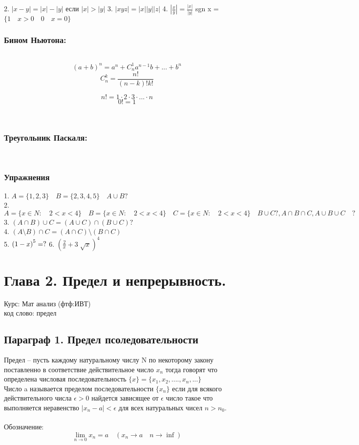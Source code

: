 \documentclass[a4paper, 12pt]{article}
\begin{document}
2. $  |x - y|= |x| - |y|$ если $ |x| > |y| $
3. $ |xyz| = |x||y||z| $
4. $ \left| \frac{x}{y}\right| =  \frac{|x|}{|y|}$
sgn x = $ \{ 1 \quad x>0 \quad 0 \quad x=0\} $\\

\subsubsection*{Бином Ньютона:}\\
\[
	\left( a + b\right)^n = a^n + C_n^1 a^{n-1}b +...+b^n	
\]
\[
	C_n^k = \frac{n!}{(n-k)!k!}	
\]

\[
	n! = 1\cdot 2 \cdot 3 \cdot ... \cdot n	
\]
\[
	0! = 1	
\]

\\
\subsubsection*{Треугольник Паскаля:}
\\
\subsubsection{Упражнения}
1. $ A=\{1,2,3\} \quad B=\{2,3,4,5\} \quad A\cup B ? $\\
2. $ A = \{x \in N: \quad 2 < x < 4\} \quad B = \{x \in N: \quad 2 < x < 4\} \quad C = \{x \in N: \quad 2 < x < 4\} \quad B\cup C ?, A\cap B\cap C,A\cup B\cup C \quad ?$\\
3. $ (A\cap B)\cup C = (A\cup C)\cap(B\cup C)? $\\
4. $ (A \setminus B)\cap C = (A\cap C)\setminus (B\cap C) $\\
5. $ \left( 1-x\right)^5 = ?\\$
6. $ \left(\frac{2}{x} + 3 \sqrt[]{x} \right)^4 $\\
\section{Глава 2. Предел и непрерывность.}
\begin{mdframed}[backgroundcolor=blue!20] 
       Курс: Мат анализ (фтф:ИВТ)\\
       код слово: предел
    \end{mdframed}
\subsection{Параграф 1. Предел псоледовательности}
Предел -- пусть каждому натуральному числу N по некоторому закону поставленно в соответствие действительное число $ x_n $ тогда говорят что определена числовая последовательность $ \{x\} = \{x_1,x_2,....,x_n,...\} $ \\
Число a называется пределом последовательности $ \{x_n\}  $ если для всякого действительного числа $ \epsilon  > 0$ найдется зависящее от $ \epsilon $ число такое что выполняется неравенство $ |x_n - a| < \epsilon  $ для всех натуральных чисел $ n > n_0 $.  \\
\\Обозначение:\\
\[
	\lim_{n\to 0} x_n  = a \quad(x_n \to a \quad n \to \inf)	
\]
 
\end{document}
